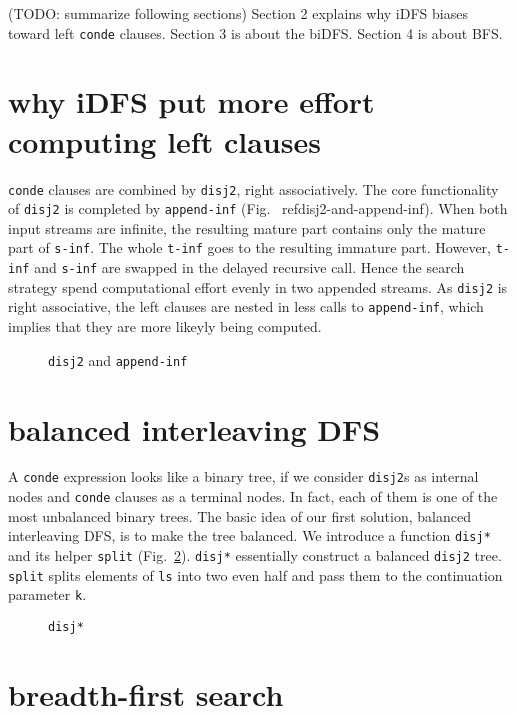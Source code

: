 \documentclass[format=acmlarge, review=true, authordraft=true]{acmart}
\begin{document}
(TODO: summarize following sections) Section 2 explains why iDFS biases toward left \texttt{conde} clauses. Section 3 is about the biDFS. Section 4 is about BFS.

\section{why iDFS put more effort computing left clauses}

\texttt{conde} clauses are combined by \texttt{disj2}, right associatively. The
core functionality of \texttt{disj2} is completed by \texttt{append-inf} (Fig.~
ref{disj2-and-append-inf}). When both input streams are infinite, the resulting
mature part contains only the mature part of \texttt{s-inf}. The whole
\texttt{t-inf} goes to the resulting immature part. However, \texttt{t-inf} and
\texttt{s-inf} are swapped in the delayed recursive call. Hence the search
strategy spend computational effort evenly in two appended streams. As
\texttt{disj2} is right associative, the left clauses are nested in less calls
to \texttt{append-inf}, which implies that they are more likeyly being
computed.

\begin{figure}
  
  \caption{\texttt{disj2} and \texttt{append-inf}}
  \label{disj2-and-append-inf}
\end{figure}
 
\section{balanced interleaving DFS}

A \texttt{conde} expression looks like a binary tree, if we consider 
\texttt{disj2}s as internal nodes and \texttt{conde} clauses as a terminal 
nodes. In fact, each of them is one of the most unbalanced binary trees. The 
basic idea of our first solution, balanced interleaving DFS, is to make the 
tree balanced. We introduce a function \texttt{disj*} and its helper 
\texttt{split} (Fig.~\ref{disj*}). \texttt{disj*} essentially construct a 
balanced \texttt{disj2} tree. \texttt{split} splits elements of \texttt{ls} 
into two even half and pass them to the continuation parameter \texttt{k}.

\begin{figure}
  
  \caption{\texttt{disj*}}
  \label{disj*}
\end{figure}

\section{breadth-first search}
\end{document}
